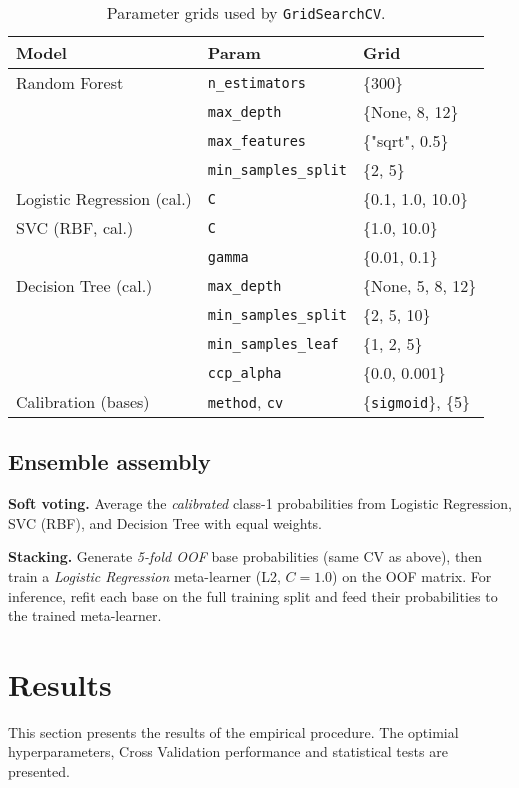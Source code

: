 \documentclass[conference]{IEEEtran}
\begin{document}
\begin{table}[h]
\centering
\footnotesize
\setlength{\tabcolsep}{3pt}
\caption{Parameter grids used by \texttt{GridSearchCV}.}
\label{tab:grids}
\begin{tabularx}{\columnwidth}{l l X}
\toprule
\textbf{Model} & \textbf{Param} & \textbf{Grid} \\
\midrule
Random Forest & \texttt{n\_estimators} & \{300\} \\
 & \texttt{max\_depth} & \{None, 8, 12\} \\
 & \texttt{max\_features} & \{"sqrt", 0.5\} \\
 & \texttt{min\_samples\_split} & \{2, 5\} \\
\addlinespace[2pt]
Logistic Regression (cal.) & \texttt{C} & \{0.1, 1.0, 10.0\} \\
\addlinespace[2pt]
SVC (RBF, cal.) & \texttt{C} & \{1.0, 10.0\} \\
 & \texttt{gamma} & \{0.01, 0.1\} \\
\addlinespace[2pt]
Decision Tree (cal.) & \texttt{max\_depth} & \{None, 5, 8, 12\} \\
 & \texttt{min\_samples\_split} & \{2, 5, 10\} \\
 & \texttt{min\_samples\_leaf} & \{1, 2, 5\} \\
 & \texttt{ccp\_alpha} & \{0.0, 0.001\} \\
\addlinespace[2pt]
Calibration (bases) & \texttt{method}, \texttt{cv} & \{\texttt{sigmoid}\}, \{5\} \\
\bottomrule
\end{tabularx}
\end{table}



\subsection{Ensemble assembly}

\textbf{Soft voting.}
Average the \emph{calibrated} class-1 probabilities from Logistic Regression, SVC (RBF), and Decision Tree with equal weights.

\textbf{Stacking.}
Generate \emph{5-fold OOF} base probabilities (same CV as above), then train a \emph{Logistic Regression} meta-learner (L2, $C{=}1.0$) on the OOF matrix.
For inference, refit each base on the full training split and feed their probabilities to the trained meta-learner.


\section{\textbf{Results}}
This section presents the results of the empirical procedure. The optimial hyperparameters, Cross Validation performance and statistical tests are presented.
\end{document}
